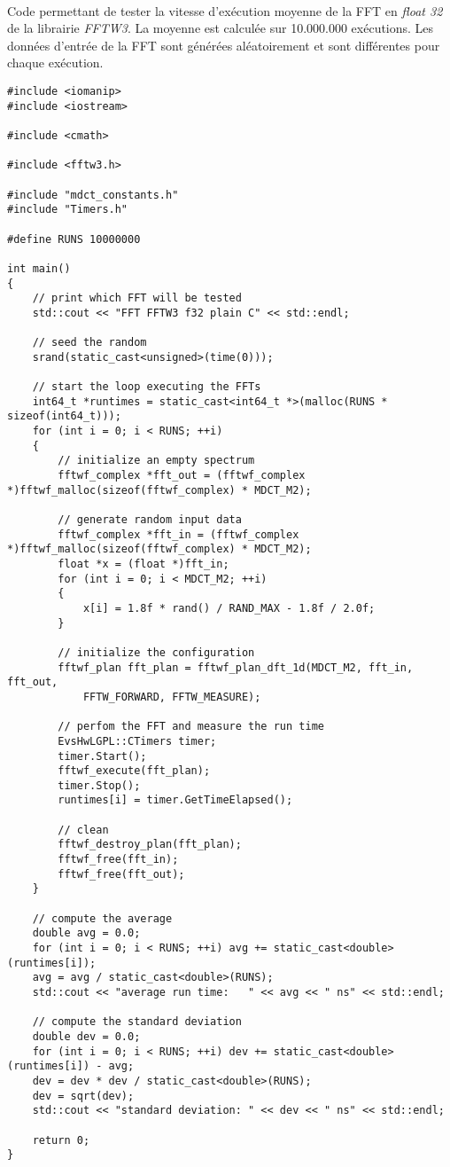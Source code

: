 \documentclass{article}
\begin{document}
\paragraph{}
Code permettant de tester la vitesse d'exécution moyenne de la FFT en \emph{float 32} de la librairie \emph{FFTW3}. La moyenne est calculée sur 10.000.000 exécutions. Les données d'entrée de la FFT sont générées aléatoirement et sont différentes pour chaque exécution.
\lstset{language=C++}
\begin{lstlisting}
#include <iomanip>
#include <iostream>

#include <cmath>

#include <fftw3.h>

#include "mdct_constants.h"
#include "Timers.h"

#define RUNS 10000000

int main()
{
    // print which FFT will be tested
    std::cout << "FFT FFTW3 f32 plain C" << std::endl;

    // seed the random
    srand(static_cast<unsigned>(time(0)));

    // start the loop executing the FFTs
    int64_t *runtimes = static_cast<int64_t *>(malloc(RUNS * sizeof(int64_t)));
    for (int i = 0; i < RUNS; ++i)
    {
        // initialize an empty spectrum
        fftwf_complex *fft_out = (fftwf_complex *)fftwf_malloc(sizeof(fftwf_complex) * MDCT_M2);

        // generate random input data
        fftwf_complex *fft_in = (fftwf_complex *)fftwf_malloc(sizeof(fftwf_complex) * MDCT_M2);
        float *x = (float *)fft_in;
        for (int i = 0; i < MDCT_M2; ++i)
        {
            x[i] = 1.8f * rand() / RAND_MAX - 1.8f / 2.0f;
        }

        // initialize the configuration
        fftwf_plan fft_plan = fftwf_plan_dft_1d(MDCT_M2, fft_in, fft_out,
            FFTW_FORWARD, FFTW_MEASURE);

        // perfom the FFT and measure the run time
        EvsHwLGPL::CTimers timer;
        timer.Start();
        fftwf_execute(fft_plan);
        timer.Stop();
        runtimes[i] = timer.GetTimeElapsed();

        // clean
        fftwf_destroy_plan(fft_plan);
        fftwf_free(fft_in);
        fftwf_free(fft_out);
    }

    // compute the average
    double avg = 0.0;
    for (int i = 0; i < RUNS; ++i) avg += static_cast<double>(runtimes[i]);
    avg = avg / static_cast<double>(RUNS);
    std::cout << "average run time:   " << avg << " ns" << std::endl;

    // compute the standard deviation
    double dev = 0.0;
    for (int i = 0; i < RUNS; ++i) dev += static_cast<double>(runtimes[i]) - avg;
    dev = dev * dev / static_cast<double>(RUNS);
    dev = sqrt(dev);
    std::cout << "standard deviation: " << dev << " ns" << std::endl;

    return 0;
}
\end{lstlisting}
\end{document}
